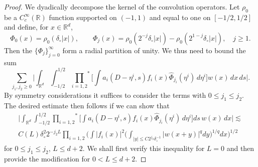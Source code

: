 \documentclass[11pt]{amsart}
\theoremstyle{definition}
\numberwithin{theorem}{section}
\numberwithin{definition}{section}
\def\prodstar{{\prod_{i=1,2}}^{\!\!*}}
\def\lc{\lesssim}
\def\bbR{{\mathbb {R}}}
\def\cT{{\mathcal {T}}}
\begin{document}
\begin{proof}


We dyadically decompose  the kernel of the convolution operators. Let
$\rho_{0}$ be a  $C^\infty_c(\bbR)$ function supported on $(-1,1)$ and equal to one on $[-1/2,1/2]$ and define, for $x\in \bbR^d$,
$$\Phi_0(x)= \rho_0(\delta_\circ| x|), \qquad \Phi_j(x)=
\rho_0(2^{-j}\delta_\circ|x|)-\rho_0(2^{1-j}\delta_\circ|x|),\quad j\ge 1.$$
Then the $\{\Phi_j\}_{j=0}^\infty$ form a radial partition of unity.
We thus need to bound the sum
$$\sum_{j_1, j_2\ge 0}
\Big|\int_{\bbR^d} \int_{-1/2}^{1/2} \prodstar\Big[
\int a_i(D-\eta^i,s)f_i(x) \widehat \Phi_{j_i}(\eta^i)\,d\eta^i
\Big]
w(x)\,dx\,ds \Big|.
$$
By symmetry considerations it suffices to consider  the terms with
$0\le j_1\le j_2$.
The desired estimate then follows if we can show that
\begin{multline}\label{fixedjweightedbd}
\Big|\int_{\bbR^d} \int_{-1/2}^{1/2}
 \prodstar\Big[
\int a_i(D-\eta^i,s)f_i(x) \widehat \Phi_{j_i}(\eta^i)\,d\eta^i
\Big]ds\,
w(x)\,dx \Big|
\lc \\ C(L)
\delta_\circ^2 2^{-j_2 L} \prod_{i=1,2} \Big(\int|f_i(x)|^2 \Big(\int_{|y|\le C
2^{j_2}\delta_\circ^{-1}} |w(x+y)|^q dy\Big)^{1/q}dx\Big)^{1/2}
\end{multline}
for
$0\le j_1\le j_2$, $L\le d+2$. We shall first verify this inequality for $L=0$ and then provide the modification for $0<L\le d+2$.


\end{proof}
\end{document}
